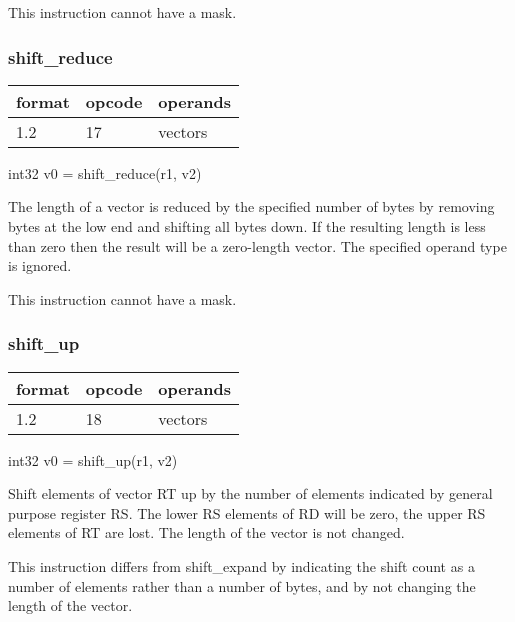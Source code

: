 \documentclass[forwardcom.tex]{subfiles}
\begin{document}
This instruction cannot have a mask.

\subsubsection{shift\_reduce}
\label{table:shiftReduceInstruction}
\begin{tabular}{|p{12mm}|p{12mm}|p{110mm}|}
\hline
\bfseries format & \bfseries opcode & \bfseries operands \\ \hline
1.2 & 17 & vectors \\ \hline
\end{tabular}
\vspace{2mm}

int32 v0 = shift\_reduce(r1, v2)
\vspace{2mm}

The length of a vector is reduced by the specified number of bytes by removing bytes at the low end and shifting all bytes down. If the resulting length is less than zero then the result will be a zero-length vector. The specified operand type is ignored.

\vspace{2mm}
This instruction cannot have a mask.

\subsubsection{shift\_up}
\label{table:shiftUpInstruction}
\begin{tabular}{|p{12mm}|p{12mm}|p{110mm}|}
\hline
\bfseries format & \bfseries opcode & \bfseries operands \\ \hline
1.2 & 18 & vectors \\ \hline
\end{tabular}
\vspace{2mm}

int32 v0 = shift\_up(r1, v2)
\vspace{2mm}

Shift elements of vector RT up by the number of elements indicated by general purpose register RS. 
The lower RS elements of RD will be zero, the upper RS elements of RT are lost. The length of the vector is not changed.
\vspace{2mm}

This instruction differs from shift\_expand by indicating the shift count as a number of elements rather than a number of bytes, and by not changing the length of the vector.
\vspace{2mm}
\end{document}
